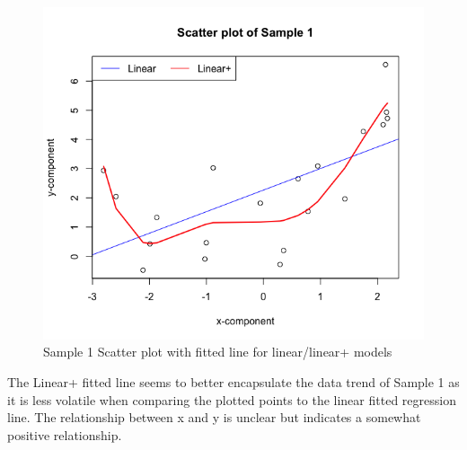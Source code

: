 \documentclass{article}
\begin{document}
\begin{figure}[!htb]
\caption{Sample 1 Scatter plot with fitted line for linear/linear+ models}
\label{returns_microsoft}
\begin{center}
\includegraphics[scale = 0.8]{sample1.png}
\end{center}
\end{figure}
The Linear+ fitted line seems to better encapsulate the data trend of Sample 1 as it is less volatile when comparing the plotted points to the linear fitted regression line. The relationship between x and y is unclear but indicates a somewhat positive relationship.
\newpage
\end{document}
